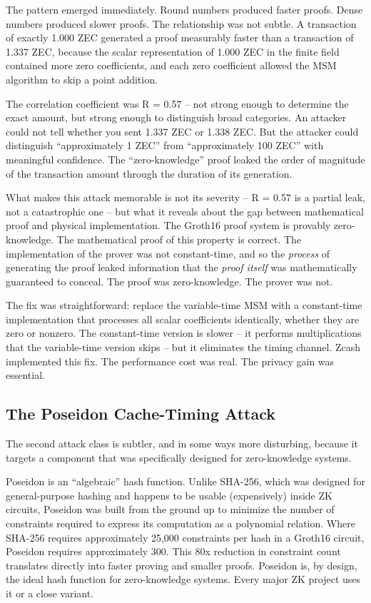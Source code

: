 \documentclass[
  11pt,
  openany]{report}
\begin{document}
The pattern emerged immediately. Round numbers produced faster proofs. Dense
numbers produced slower proofs. The relationship was not subtle. A transaction
of exactly 1.000 ZEC generated a proof measurably faster than a transaction of
1.337 ZEC, because the scalar representation of 1.000 ZEC in the finite field
contained more zero coefficients, and each zero coefficient allowed the MSM
algorithm to skip a point addition.

The correlation coefficient was R = 0.57 -- not strong enough to determine the
exact amount, but strong enough to distinguish broad categories. An attacker
could not tell whether you sent 1.337 ZEC or 1.338 ZEC. But the attacker could
distinguish ``approximately 1 ZEC'' from ``approximately 100 ZEC'' with
meaningful confidence. The ``zero-knowledge'' proof leaked the order of
magnitude of the transaction amount through the duration of its generation.

What makes this attack memorable is not its severity -- R = 0.57 is a partial
leak, not a catastrophic one -- but what it reveals about the gap between
mathematical proof and physical implementation. The Groth16 proof system is
provably zero-knowledge. The mathematical proof of this property is correct. The
implementation of the prover was not constant-time, and so the \emph{process} of
generating the proof leaked information that the \emph{proof itself} was
mathematically guaranteed to conceal. The proof was zero-knowledge. The prover
was not.

The fix was straightforward: replace the variable-time MSM with a constant-time
implementation that processes all scalar coefficients identically, whether they
are zero or nonzero. The constant-time version is slower -- it performs
multiplications that the variable-time version skips -- but it eliminates the
timing channel. Zcash implemented this fix. The performance cost was real. The
privacy gain was essential.

\subsection{The Poseidon Cache-Timing
Attack}\label{the-poseidon-cache-timing-attack}

The second attack class is subtler, and in some ways more disturbing, because it
targets a component that was specifically designed for zero-knowledge systems.

Poseidon is an ``algebraic'' hash function. Unlike SHA-256, which was designed
for general-purpose hashing and happens to be usable (expensively) inside ZK
circuits, Poseidon was built from the ground up to minimize the number of
constraints required to express its computation as a polynomial relation. Where
SHA-256 requires approximately 25,000 constraints per hash in a Groth16 circuit,
Poseidon requires approximately 300. This 80x reduction in constraint count
translates directly into faster proving and smaller proofs. Poseidon is, by
design, the ideal hash function for zero-knowledge systems. Every major ZK
project uses it or a close variant.
\end{document}
